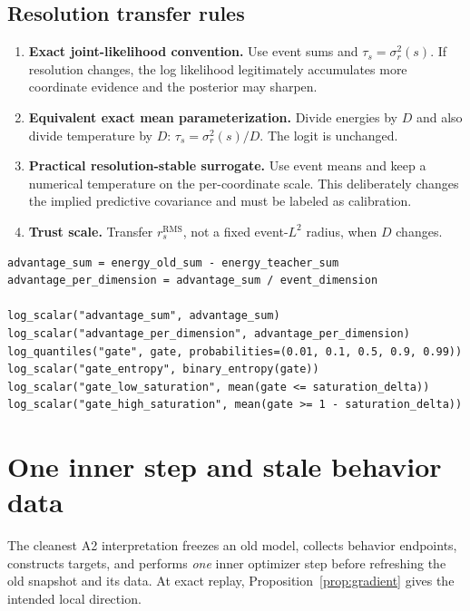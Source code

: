 \documentclass[11pt,a4paper]{article}
\newcommand{\RMS}{\operatorname{RMS}}
\theoremstyle{plain}
\theoremstyle{definition}
\begin{document}
\subsection{Resolution transfer rules}

\begin{enumerate}[leftmargin=1.6em]
\item \textbf{Exact joint-likelihood convention.}  Use event sums and
      $\tau_s=\sigma_r^2(s)$.  If resolution changes, the log likelihood legitimately accumulates
      more coordinate evidence and the posterior may sharpen.
\item \textbf{Equivalent exact mean parameterization.}  Divide energies by $D$ and also divide
      temperature by $D$: $\tau_s=\sigma_r^2(s)/D$.  The logit is unchanged.
\item \textbf{Practical resolution-stable surrogate.}  Use event means and keep a numerical
      temperature on the per-coordinate scale.  This deliberately changes the implied
      predictive covariance and must be labeled as calibration.
\item \textbf{Trust scale.}  Transfer $r_s^{\RMS}$, not a fixed event-$L^2$ radius, when $D$
      changes.
\end{enumerate}

\begin{lstlisting}[style=goodpython,caption={Good conceptual calibration diagnostics retain both event scales.}]
advantage_sum = energy_old_sum - energy_teacher_sum
advantage_per_dimension = advantage_sum / event_dimension

log_scalar("advantage_sum", advantage_sum)
log_scalar("advantage_per_dimension", advantage_per_dimension)
log_quantiles("gate", gate, probabilities=(0.01, 0.1, 0.5, 0.9, 0.99))
log_scalar("gate_entropy", binary_entropy(gate))
log_scalar("gate_low_saturation", mean(gate <= saturation_delta))
log_scalar("gate_high_saturation", mean(gate >= 1 - saturation_delta))
\end{lstlisting}

\section{One inner step and stale behavior data}
\label{sec:stale}

The cleanest A2 interpretation freezes an old model, collects behavior endpoints, constructs
targets, and performs \emph{one} inner optimizer step before refreshing the old snapshot and its
data.  At exact replay, Proposition~\ref{prop:gradient} gives the intended local direction.
\end{document}
